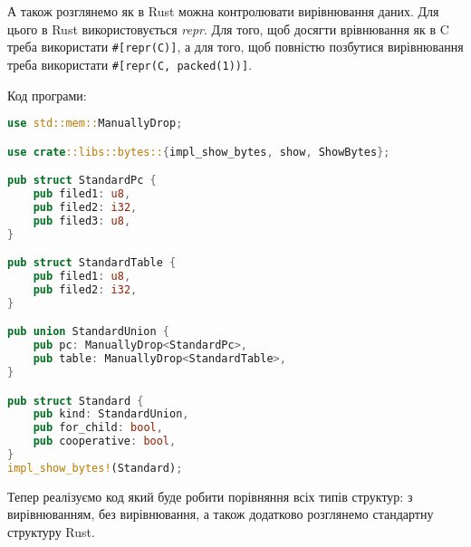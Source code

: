 А також розглянемо як в Rust можна контролювати вирівнювання даних.
Для цього в Rust використовується \textit{repr}.
Для того, щоб досягти врівнювання як в C треба використати \verb|#[repr(C)]|,
а для того, щоб повністю позбутися вирівнювання треба використати \verb|#[repr(C, packed(1))]|.

\noindent
Код програми:
\begin{lstlisting}[language=Rust, style=colouredRust]
use std::mem::ManuallyDrop;

use crate::libs::bytes::{impl_show_bytes, show, ShowBytes};

pub struct StandardPc {
    pub filed1: u8,
    pub filed2: i32,
    pub filed3: u8,
}

pub struct StandardTable {
    pub filed1: u8,
    pub filed2: i32,
}

pub union StandardUnion {
    pub pc: ManuallyDrop<StandardPc>,
    pub table: ManuallyDrop<StandardTable>,
}

pub struct Standard {
    pub kind: StandardUnion,
    pub for_child: bool,
    pub cooperative: bool,
}
impl_show_bytes!(Standard);
\end{lstlisting}


Тепер реалізуємо код який буде робити порівняння всіх типів структур: з вирівнюванням, без вирівнювання, а також додатково розглянемо стандартну структуру Rust.

